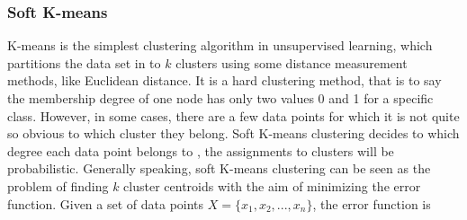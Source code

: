 \documentclass[11pt]{report}
\begin{document}
	\subsubsection{Soft K-means}
	\cite{report} K-means is the simplest clustering algorithm in unsupervised learning, which partitions the data set in to $k$ clusters using some distance measurement methods, like Euclidean distance. It is a hard clustering method, that is to say the membership degree of one node has only two values 0 and 1 for a specific class. However, in some cases, there are a few data points for which it is not quite so obvious to which cluster they belong. Soft K-means clustering decides to which degree each data point belongs to , the assignments to clusters will be probabilistic. Generally speaking, soft K-means clustering can be seen as the problem of finding $k$ cluster centroids with the aim of minimizing the error function. Given a set of data points $X = \{x_1,x_2,...,x_n\}$, the error function is
	
\end{document}
